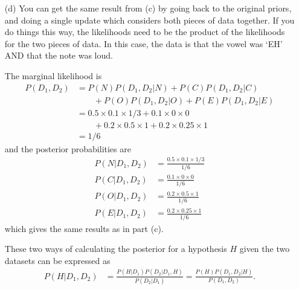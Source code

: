 \documentclass[a4paper, 12pt]{article}
\begin{document}
\begin{enumerate}
\item[(d)] You can get the same result from (c) by going back to the original
priors, and doing a single update which considers both pieces of data together.
If you do things this way, the likelihoods need to be the product of the likelihoods
for the two pieces of data. In this case, the data is that the vowel was `EH' AND
that the note was loud.

The marginal likelihood is 
\begin{align*}
P(D_1, D_2) &= P(N)P(D_1, D_2|N)+P(C)P(D_1, D_2|C)\\
            & \quad\quad+P(O)P(D_1, D_2|O)+P(E)P(D_1, D_2|E) \\
            &= 0.5\times 0.1 \times 1/3 + 0.1 \times 0 \times 0 \\
            &\quad\quad + 0.2 \times 0.5 \times 1 + 0.2 \times 0.25 \times 1\\
            &= 1/6
\end{align*}
and the posterior probabilities are
\begin{align*}
P(N|D_1, D_2) &= \frac{0.5\times 0.1 \times 1/3}{1/6}\\
P(C|D_1, D_2) &= \frac{0.1 \times 0 \times 0}{1/6}\\
P(O|D_1, D_2) &= \frac{0.2 \times 0.5 \times 1}{1/6}\\
P(E|D_1, D_2) &= \frac{0.2 \times 0.25 \times 1}{1/6}
\end{align*}
which gives the same results as in part (c).

These two ways of calculating the posterior for a hypothesis $H$
given the two datasets can be
expressed as
\begin{align}
P(H | D_1, D_2) &= \frac{P(H|D_1)P(D_2|D_1,H)}{P(D_2|D_1)} = \frac{P(H)P(D_1, D_2|H)}{P(D_1, D_2)}.
\end{align}



\end{enumerate}
\end{document}
